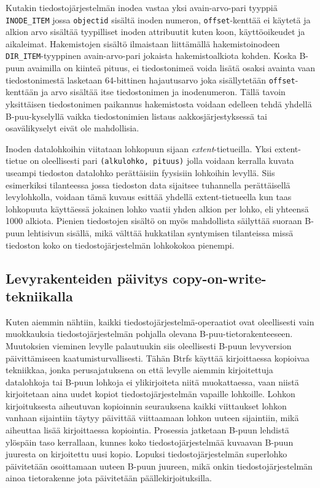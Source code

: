 Kutakin tiedostojärjestelmän inodea vastaa yksi avain-arvo-pari tyyppiä \texttt{INODE\_ITEM} jossa \texttt{objectid} sisältä inoden numeron, \texttt{offset}-kenttää ei käytetä ja alkion arvo sisältää tyypilliset inoden attribuutit kuten koon, käyttöoikeudet ja aikaleimat.
Hakemistojen sisältö ilmaistaan liittämällä hakemistoinodeen \texttt{DIR\_ITEM}-tyyppinen avain-arvo-pari jokaista hakemistoalkiota kohden.
Koska B-puun avaimilla on kiinteä pituus, ei tiedostonimeä voida lisätä osaksi avainta vaan tiedostonimestä lasketaan 64-bittinen hajautusarvo joka sisällytetään \texttt{offset}-kenttään ja arvo sisältää itse tiedostonimen ja inodenumeron.
Tällä tavoin yksittäisen tiedostonimen paikannus hakemistosta voidaan edelleen tehdä yhdellä B-puu-kyselyllä vaikka tiedostonimien listaus aakkosjärjestyksessä tai osavälikyselyt eivät ole mahdollisia.

Inoden datalohkoihin viitataan lohkopuun sijaan \emph{extent}-tietueilla.
Yksi extent-tietue on oleellisesti pari \texttt{(alkulohko, pituus)} jolla voidaan kerralla kuvata useampi tiedoston datalohko perättäisiin fyysisiin lohkoihin levyllä.
Siis esimerkiksi tilanteessa jossa tiedoston data sijaitsee tuhannella perättäisellä levylohkolla,
voidaan tämä kuvaus esittää yhdellä extent-tietueella kun taas lohkopuuta käyttäessä jokainen lohko vaatii yhden alkion per lohko, eli yhteensä 1000 alkiota.
Pienien tiedostojen sisältö on myös mahdollista säilyttää suoraan B-puun lehtisivun sisällä,
mikä välttää hukkatilan syntymisen tilanteissa missä tiedoston koko on tiedostojärjestelmän lohkokokoa pienempi.

\subsection{Levyrakenteiden päivitys copy-on-write-tekniikalla}
Kuten aiemmin nähtiin, kaikki tiedostojärjestelmä-operaatiot ovat oleellisesti vain muokkauksia tiedostojärjestelmän pohjalla olevana B-puu-tietorakenteeseen.
Muutoksien vieminen levylle palautuukin siis oleellisesti B-puun levyversion päivittämiseen kaatumisturvallisesti.
Tähän Btrfs käyttää kirjoittaessa kopioivaa tekniikkaa,
jonka perusajatuksena on että levylle aiemmin kirjoitettuja datalohkoja tai B-puun lohkoja ei ylikirjoiteta niitä muokattaessa,
vaan niistä kirjoitetaan aina uudet kopiot tiedostojärjestelmän vapaille lohkoille.
Lohkon kirjoituksesta aiheutuvan kopioinnin seurauksena kaikki viittaukset lohkon vanhaan sijaintiin täytyy päivittää viittaamaan lohkon uuteen sijaintiin,
mikä aiheuttaa lisää kirjoittaessa kopiointia.
Prosessia jatketaan B-puun lehdistä ylöspäin taso kerrallaan,
kunnes koko tiedostojärjestelmää kuvaavan B-puun juuresta on kirjoitettu uusi kopio.
Lopuksi tiedostojärjestelmän superlohko päivitetään osoittamaan uuteen B-puun juureen,
mikä onkin tiedostojärjestelmän ainoa tietorakenne jota päivitetään päällekirjoituksilla.

